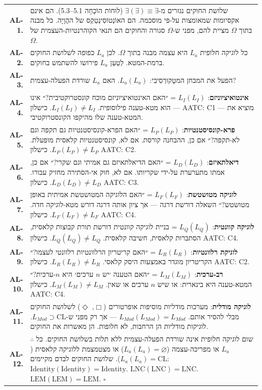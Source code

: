 \documentclass[10pt, openany, oneside]{book}
\renewcommand{\footnotesize}{\fontsize{8.5}{11}\selectfont}
\begin{document}
{\footnotesize
\noindent\begin{tabular}{r p{}}
\textbf{AL-1.} & שלושת החוקים נגזרים מ-$\exists(\exists) \equiv \exists$ (לוּחוֹת הוֹכָחָה 5.1–5.3). הם אינם אקסיומות שמאומצות על-פי מוסכמה. הם האוֹנְטוֹסִינְטַקְס של ההֲוָיָה. כל מבנה בתוך $\Omega$ מציית להם, מפני ש-$\Omega$ סגורה והחוקים הם תנאי הקוהרנטיות-העצמית של $\Omega$. \\[0.3em]
\textbf{AL-2.} & כל לוגיקה חלופית $L_a$ היא עצמה מבנה בתוך $\Omega$. לכן $L_a$ כפופה לשלושת החוקים ברמת-המטא. לְטַעֵן $L_a$ פירושו להשתמש בחוקים. \\[0.3em]
\textbf{AL-3.} & הפעל את המבחן המטָקוּרְסִיבִי: $L_a(L_a)$. האם $L_a$ שורדת הפעלה-עצמית? \\[0.3em]
\textbf{AL-4.} & \textbf{אינטואיציוניזם}: $L_I(L_I)$ = ״האם האינטואיציוניזם מוכח קונסטרוקטיבית?״ אינו — הוא מטא-טענה פילוסופית. $L_I(L_I) \neq L_I$. כישלון AATC: C1 — מוציא את המטא-טענה שלו מהיקפו הקונסטרוקטיבי. \\[0.3em]
\textbf{AL-5.} & \textbf{פרא-קונסיסטנטיות}: $L_P(L_P)$ = ״האם הפרא-קונסיסטנטיות גם תקפה וגם לא-תקפה?״ אם כן, ההבחנה קורסת. אם לא, קונסיסטנטיות קלאסית מופעלת. $L_P(L_P) \neq L_P$. כישלון AATC: C2. \\[0.3em]
\textbf{AL-6.} & \textbf{דיאלתאיזם}: $L_D(L_D)$ = ״האם הדיאלתאיזם גם אמיתי וגם שקרי?״ אם כן, אמתו מתערערת על-ידי שקריותו. אם לא, חוק אי-הסתירה מחזיק עבורו. $L_D(L_D) \neq L_D$. כישלון AATC: C3. \\[0.3em]
\textbf{AL-7.} & \textbf{לוגיקה מטושטשת}: $L_F(L_F)$ = ״האם הלוגיקה המטושטשת אמיתית באופן מטושטש?״ השאלה דורשת דרגה — אך ציון אותה דרגה דורש מטא-לוגיקה חדה. $L_F(L_F) \neq L_F$. כישלון AATC: C4. \\[0.3em]
\textbf{AL-8.} & \textbf{לוגיקה קוונטית}: $L_Q(L_Q)$ = בניית לוגיקה קוונטית דורשת תורת קבוצות קלאסית, הסתברות קלאסית, חשיבה קלאסית. $L_Q(L_Q) \neq L_Q$. כישלון AATC: C4. \\[0.3em]
\textbf{AL-9.} & \textbf{לוגיקת רלוונטיות}: $L_R(L_R)$ = ״האם קריטריון הרלוונטיות רלוונטי לעצמו?״ הקריטריון מוגדר באמצעות היסק קלאסי. $L_R(L_R) \neq L_R$. כישלון AATC: C2. \\[0.3em]
\textbf{AL-10.} & \textbf{רב-ערכית}: $L_M(L_M)$ = ״האם הטענה ׳יש $n$ ערכים׳ היא $n$-ערכית?״ המטא-טענה היא בינארית: או שיש $n$ ערכים או שאין. $L_M(L_M) \neq L_M$. כישלון AATC: C4. \\[0.3em]
\textbf{AL-11.} & \textbf{לוגיקה מודלית}: מערכות מודליות מוסיפות אופרטורים ($\Box$, $\Diamond$) לשלושת החוקים מבלי להסיר אותם. $L_{Mod}(L_{Mod}) = L_{Mod}$ — אך רק מפני ש-$L_{Mod} \supset \text{CL}$. לוגיקות מודליות הן הרחבות, לא חלופות. הן מאשרות את החוקים. \\[0.3em]
\textbf{AL-12.} & $\therefore$ שום לוגיקה חלופית אינה שורדת הפעלה-עצמית ללא תלות בשלושת החוקים. כל $L_a$ או מפריכה-עצמה ($L_a(L_a) = \varnothing$) או מצטמצמת ללוגיקה קלאסית ($L_a(L_a) = \text{CL}$). שלושת החוקים לבדם מקיימים: $\text{Identity}(\text{Identity}) = \text{Identity}$. $\text{LNC}(\text{LNC}) = \text{LNC}$. $\text{LEM}(\text{LEM}) = \text{LEM}$. $\square$ \\[0.3em]
\end{tabular}
}
\end{document}
